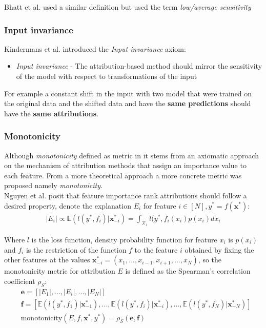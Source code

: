 \documentclass[12pt]{report}
\begin{document}
Bhatt et al.  \cite{DBLP:journals/corr/abs-2005-00631}  used a similar definition but used the term \textit{low/average sensitivity}
\subsubsection{Input invariance}

Kindermans et al. \cite{https://doi.org/10.48550/arxiv.1711.00867} introduced the \textit{Input invariance} axiom:
\begin{itemize}
	\item \textit{Input invariance} - The attribution-based method should mirror the sensitivity of the model with respect to transformations of the input
\end{itemize}

For example a constant shift in the input with two model that were trained on the original data and the shifted data and have the \textbf{same predictions} should have the \textbf{same attributions}. \\

\subsubsection{Monotonicity}

Although \textit{monotonicity} defined as metric in \cite{DBLP:journals/corr/abs-2007-07584} it stems from an axiomatic approach on the mechanism of attribution methods that assign an importance value to each feature. From a more theoretical approach a more concrete metric was proposed namely \textit{monotonicity}. \\

Nguyen et al. \cite{DBLP:journals/corr/abs-2007-07584}  posit that feature importance rank attributions should follow a desired property, denote the explanation $E_i$ for feature $i \in [N], y^* = f(\mathbf{x}^*)$:
\begin{align*}
	|E_i| \propto \mathbb{E}(l(y^*, f_i)|\mathbf{x}^*_{-i}) = \int_{\mathcal{X}_i} l(y^*, f_i(x_i)p(x_i) d x_i
\end{align*}

Where $l$ is the loss function, density probability function for feature $x_i$ is $p(x_i)$ and $f_i$ is the restriction of the function $f$ to the feature $i$ obtained by fixing the other features at the values $\mathbf{x}^{*}_{-i} = (x_1, ..., x_{i-1}, x_{i+1} , ... , x_{N})$, so the monotonicity metric for attribution $E$ is defined as the Spearman’s
correlation coefficient $\rho_{S}$:
\begin{align*}
	&\mathbf{e} = [|E_1|, ..., |E_i|,..., |E_N|] \\
	&\mathbf{f}  =  [\mathbb{E}(l(y^*, f_1)|\mathbf{x}^*_{-1}), ..., \mathbb{E}(l(y^*, f_i)|\mathbf{x}^*_{-i}) ,..., \mathbb{E}(l(y^*, f_N)|\mathbf{x}^*_{-N})] \\
	&\text{monotonicity}(E,f, \mathbf{x}^*,y^*)   = \rho_{S}(\mathbf{e}, \mathbf{f})
\end{align*}
\end{document}
